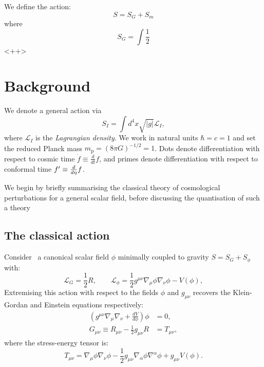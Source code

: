 We define the action:
\begin{equation}
  S = S_G + S_m
  \label{eqn:cos:action}
\end{equation}
where
\begin{equation}
  S_G = \int \frac{1}{2}
  \label{<++>}
\end{equation}<++>

\section{Background}
\label{sec:background}

\clearpage{}

We denote a general action via
\begin{equation}
  S_I = \int d^4x\sqrt{|g|}\mathcal{L}_I,
  \label{eqn:general_action}
\end{equation}
where $\mathcal{L}_I$ is the {\em Lagrangian density}. We work in natural units $\hbar=c=1$ and set the reduced Planck mass $m_\mathrm{p} = {(8\pi G)}^{-1/2} = 1$. Dots denote differentiation with respect to cosmic time $\dot{f}\equiv \frac{d}{dt}f$, and primes denote differentiation with respect to conformal time ${{f}^\prime}\equiv\frac{d}{d\eta}f$.

We begin by briefly summarising the classical theory of cosmological perturbations for a general scalar field, before discussing the quantisation of such a theory


\subsection{The classical action}
\label{sec:inflation}
Consider~\cite{Baumann+2009} a canonical scalar field $\phi$ minimally coupled to gravity $S= S_G + S_\phi$ with:
\begin{equation}
  \mathcal{L}_G = \frac{1}{2}R, 
  \qquad
  \mathcal{L}_\phi = \frac{1}{2}g^{\mu\nu}\nabla_\mu\phi\nabla_\nu\phi - V(\phi),
  \label{eqn:action}
\end{equation}
Extremising this action with respect to the fields $\phi$ and $g_{\mu\nu}$ recovers the Klein-Gordan and Einstein equations respectively:
\begin{align}
  \left( g^{\mu\nu}\nabla_\mu\nabla_\nu + \frac{dV}{d\phi} \right) \phi &= 0,
  \label{eqn:klein_gordon}\\
  G_{\mu\nu}\equiv R_{\mu\nu}-\frac{1}{2}g_{\mu\nu}R&= T_{\mu\nu},
  \label{eqn:einstein}
\end{align}
where the stress-energy tensor is:
\begin{equation}
  T_{\mu\nu} = \nabla_\mu\phi \nabla_\nu\phi - \frac{1}{2}g_{\mu\nu} \nabla_\alpha\phi \nabla^\alpha\phi +g_{\mu\nu} V(\phi).
  \label{eqn:SET}
\end{equation}

